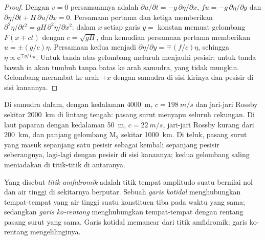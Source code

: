 \begin{proof}
Dengan $v = 0$ persamaannya adalah $\partial u/\partial t = -g\,\partial\eta/
\partial x$, $fu = -g\,\partial\eta/\partial y$ dan $\partial\eta/\partial t
+ H\,\partial u/\partial x = 0$. Persamaan pertama dan ketiga memberikan $\partial^2
\eta/\partial t^2 = gH\,\partial^2\eta/\partial x^2$: dalam $x$ setiap garis
$y = $ konstan memuat gelombang $F(x \mp ct)$ dengan $c = \sqrt{gH}$, dan kemudian persamaan
pertama memberikan $u = \pm(g/c)\eta$. Persamaan kedua menjadi $\partial\eta/
\partial y = \mp(f/c)\eta$, sehingga $\eta \propto \mathrm e^{\mp y/L_R}$. Untuk
tanda atas gelombang meluruh menjauhi pesisir; untuk tanda bawah ia
akan tumbuh tanpa batas ke arah samudra, yang tidak mungkin. Gelombang merambat
ke arah $+x$ dengan samudra di sisi kirinya dan pesisir di sisi kanannya.
\end{proof}

Di samudra dalam, dengan kedalaman \qty{4000}{m}, $c = \qty{198}{m/s}$ dan
jari-jari Rossby sekitar \qty{2000}{km} di lintang tengah: pasang surut menyapu
seluruh cekungan. Di laut paparan dengan kedalaman \qty{50}{m}, $c =
\qty{22}{m/s}$, jari-jari Rossby kurang dari \qty{200}{km}, dan panjang gelombang M$_2$
sekitar \qty{1000}{km}. Di teluk, pasang surut yang masuk sepanjang satu
pesisir sebagai  kembali sepanjang pesisir seberangnya, lagi-lagi dengan
pesisir di sisi kanannya; kedua gelombang saling meniadakan di titik-titik di antaranya.

\begin{definition}\label{def:b3:ocean-dynamics:amphidrome}
Yang disebut \emph{titik amfidromik} adalah titik tempat
amplitudo suatu  bernilai nol dan air tinggi di sekitarnya
berputar. Sebuah \emph{garis kotidal} menghubungkan tempat-tempat yang
air tinggi suatu konstituen tiba pada waktu yang sama; sedangkan \emph{garis
ko-rentang} menghubungkan tempat-tempat dengan rentang pasang surut yang sama.
Garis kotidal memancar dari titik amfidromik; garis ko-rentang mengelilinginya.
\end{definition}

